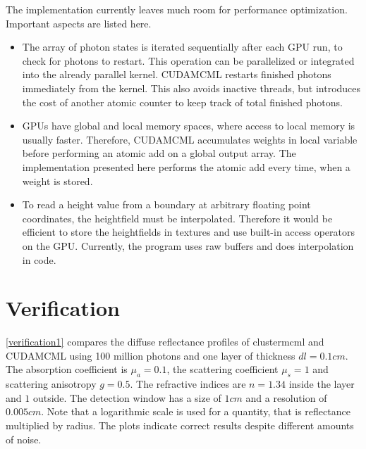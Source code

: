 \documentclass[]{article}
\begin{document}
The implementation currently leaves much room for performance optimization. Important aspects are listed here.

\begin{itemize}
\item The array of photon states is iterated sequentially after each GPU run, to check for photons to restart. This operation can be parallelized or integrated into the already parallel kernel. CUDAMCML restarts finished photons immediately from the kernel. This also avoids inactive threads, but introduces the cost of another atomic counter to keep track of total finished photons.
	
\item GPUs have global and local memory spaces, where access to local memory is usually faster. Therefore, CUDAMCML accumulates weights in local variable before performing an atomic add on a global output array. The implementation presented here performs the atomic add every time, when a weight is stored.
	
\item To read a height value from a boundary at arbitrary floating point coordinates, the heightfield must be interpolated. Therefore it would be efficient to store the heightfields in textures and use built-in access operators on the GPU. Currently, the program uses raw buffers and does interpolation in code.
\end{itemize}

\section{Verification}

\autoref{verification1} compares the diffuse reflectance profiles of clustermcml and CUDAMCML using 100 million photons and one layer of thickness $dl=0.1cm$. The absorption coefficient is $\mu_a=0.1$, the scattering coefficient $\mu_s=1$ and scattering anisotropy $g=0.5$. The refractive indices are $n=1.34$ inside the layer and $1$ outside. The detection window has a size of $1cm$ and a resolution of $0.005cm$. Note that a logarithmic scale is used for a quantity, that is reflectance multiplied by radius. The plots indicate correct results despite different amounts of noise.
\end{document}
